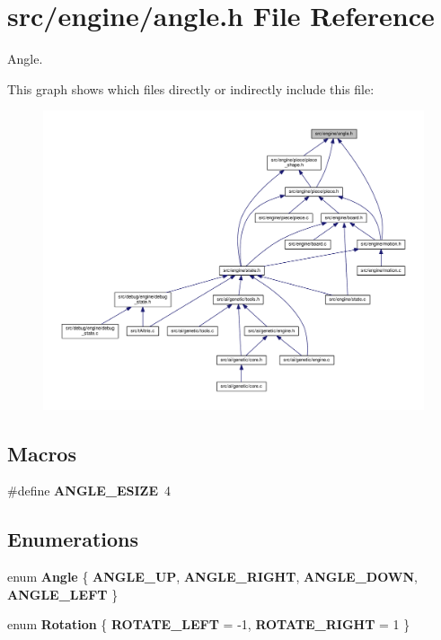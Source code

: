 \section{src/engine/angle.h File Reference}
\label{angle_8h}


Angle.  


This graph shows which files directly or indirectly include this file\+:
\nopagebreak
\begin{figure}[H]
\begin{center}
\leavevmode
\includegraphics[width=350pt]{angle_8h__dep__incl}
\end{center}
\end{figure}
\subsection*{Macros}
\begin{DoxyCompactItemize}
\item 
\#define \textbf{ A\+N\+G\+L\+E\+\_\+\+E\+S\+I\+ZE}~4
\end{DoxyCompactItemize}
\subsection*{Enumerations}
\begin{DoxyCompactItemize}
\item 
enum \textbf{ Angle} \{ \textbf{ A\+N\+G\+L\+E\+\_\+\+UP}, 
\textbf{ A\+N\+G\+L\+E\+\_\+\+R\+I\+G\+HT}, 
\textbf{ A\+N\+G\+L\+E\+\_\+\+D\+O\+WN}, 
\textbf{ A\+N\+G\+L\+E\+\_\+\+L\+E\+FT}
 \}
\item 
enum \textbf{ Rotation} \{ \textbf{ R\+O\+T\+A\+T\+E\+\_\+\+L\+E\+FT} = -\/1, 
\textbf{ R\+O\+T\+A\+T\+E\+\_\+\+R\+I\+G\+HT} = 1
 \}
\end{DoxyCompactItemize}


